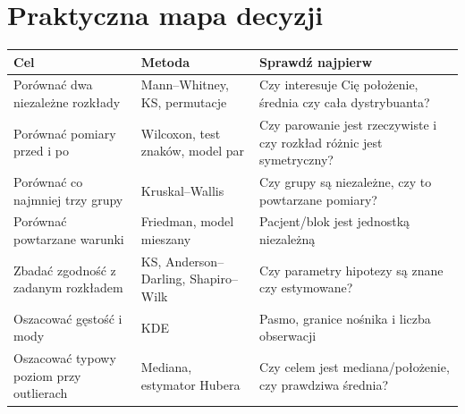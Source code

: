 \documentclass[11pt,a4paper,oneside]{report}
\numberwithin{equation}{chapter}
\theoremstyle{plain}
\theoremstyle{definition}
\theoremstyle{remark}
\begin{document}
\section{Praktyczna mapa decyzji}
\begin{center}\small
\begin{tabular}{>{\raggedright\arraybackslash}p{}>{\raggedright\arraybackslash}p{}>{\raggedright\arraybackslash}p{}}
\toprule
\textbf{Cel} & \textbf{Metoda} & \textbf{Sprawdź najpierw}\\
\midrule
Porównać dwa niezależne rozkłady & Mann--Whitney, KS, permutacje & Czy interesuje Cię położenie, średnia czy cała dystrybuanta?\\
Porównać pomiary przed i po & Wilcoxon, test znaków, model par & Czy parowanie jest rzeczywiste i czy rozkład różnic jest symetryczny?\\
Porównać co najmniej trzy grupy & Kruskal--Wallis & Czy grupy są niezależne, czy to powtarzane pomiary?\\
Porównać powtarzane warunki & Friedman, model mieszany & Pacjent/blok jest jednostką niezależną\\
Zbadać zgodność z zadanym rozkładem & KS, Anderson--Darling, Shapiro--Wilk & Czy parametry hipotezy są znane czy estymowane?\\
Oszacować gęstość i mody & KDE & Pasmo, granice nośnika i liczba obserwacji\\
Oszacować typowy poziom przy outlierach & Mediana, estymator Hubera & Czy celem jest mediana/położenie, czy prawdziwa średnia?\\
\bottomrule
\end{tabular}
\end{center}
\end{document}
